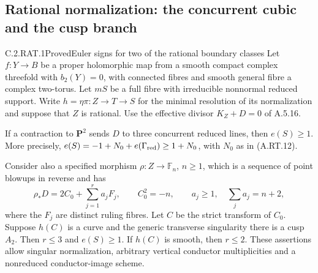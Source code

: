 \subsection{Rational normalization: the concurrent cubic and the cusp branch}

\begin{statement}{C.2.RAT.1}{Proved}{Euler signs for two of the rational boundary classes}
Let $f:Y\to B$ be a proper holomorphic map from a smooth compact
complex threefold with $b_2(Y)=0$, with connected fibres and smooth
general fibre a complex two-torus. Let $mS$ be a full fibre with
irreducible nonnormal reduced support. Write
$h=\eta\pi:Z\to T\to S$ for the minimal resolution of its
normalization and suppose that $Z$ is rational. Use the effective
divisor $K_Z+D=0$ of A.5.16.

If a contraction to $\mathbf P^2$ sends $D$ to three concurrent
reduced lines, then $e(S)\ge1$. More precisely,
$e(S)=-1+N_0+e(\Gamma_{\rm red})\ge1+N_0$, with $N_0$ as in
(A.RT.12).

Consider also a specified morphism $\rho:Z\to\mathbb F_n$,
$n\ge1$, which is a sequence of point blowups in reverse and has
\[
 \rho_*D=2C_0+\sum_{j=1}^r a_jF_j,\qquad
 C_0^2=-n,\qquad
 a_j\ge1,\quad \sum_j a_j=n+2,                  \tag{C.RA.1}
\]
where the $F_j$ are distinct ruling fibres. Let $C$ be the
strict transform of $C_0$. Suppose $h(C)$ is a curve and the
generic transverse singularity there is a cusp $A_2$.
Then $r\le3$ and $e(S)\ge1$. If $h(C)$ is smooth, then
$r\le2$. These assertions allow singular normalization,
arbitrary vertical conductor multiplicities and a nonreduced
conductor-image scheme.
\end{statement}
